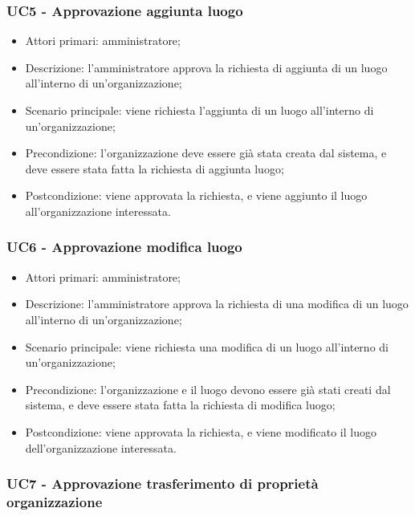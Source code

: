 \subsubsection{UC5 - Approvazione aggiunta luogo}

\begin{itemize}
\item Attori primari: amministratore;
\item Descrizione: l'amministratore approva la richiesta di aggiunta di un luogo all'interno di un'organizzazione;
\item Scenario principale: viene richiesta l'aggiunta di un luogo all'interno di un'organizzazione;
\item Precondizione: l'organizzazione deve essere già stata creata dal sistema, e deve essere stata fatta la richiesta di aggiunta luogo;
\item Postcondizione: viene approvata la richiesta, e viene aggiunto il luogo all'organizzazione interessata.

\end{itemize}

\subsubsection{UC6 - Approvazione modifica luogo}

\begin{itemize}
\item Attori primari: amministratore;
\item Descrizione: l'amministratore approva la richiesta di una modifica di un luogo all'interno di un'organizzazione;
\item Scenario principale: viene richiesta una modifica di un luogo all'interno di un'organizzazione;
\item Precondizione: l'organizzazione e il luogo devono essere già stati creati dal sistema, e deve essere stata fatta la richiesta di modifica luogo;
\item Postcondizione: viene approvata la richiesta, e viene modificato il luogo dell'organizzazione interessata.

\end{itemize}

\subsubsection{UC7 - Approvazione trasferimento di proprietà organizzazione}

